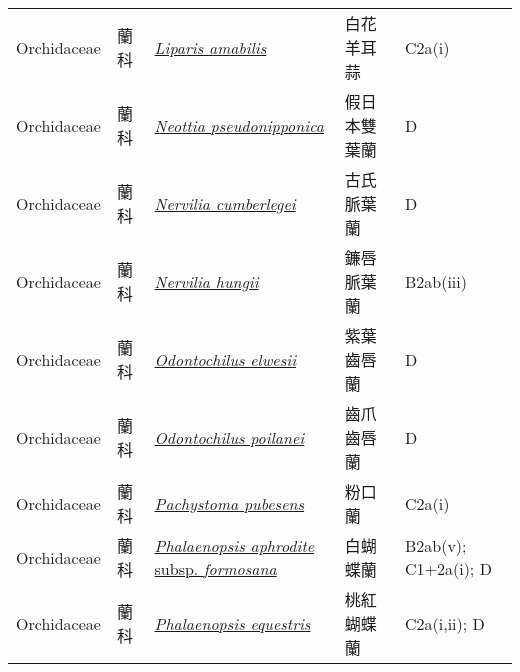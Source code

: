 {\begin{longtable}{L{2.5cm}L{2cm}L{5cm}L{2.5cm}L{3cm}}
    Orchidaceae & 蘭科 & \href{http://www.theplantlist.org/tpl1.1/search?q=Liparis+amabilis}{\textit{Liparis amabilis} } & 白花羊耳蒜 & C2a(i)    \\
    Orchidaceae & 蘭科 & \href{http://www.theplantlist.org/tpl1.1/search?q=Neottia+pseudonipponica}{\textit{Neottia pseudonipponica} } & 假日本雙葉蘭 & D    \\
    Orchidaceae & 蘭科 & \href{http://www.theplantlist.org/tpl1.1/search?q=Nervilia+cumberlegei}{\textit{Nervilia cumberlegei} } & 古氏脈葉蘭 & D    \\
    Orchidaceae & 蘭科 & \href{http://www.theplantlist.org/tpl1.1/search?q=Nervilia+hungii}{\textit{Nervilia hungii} } & 鐮唇脈葉蘭 & B2ab(iii)    \\
    Orchidaceae & 蘭科 & \href{http://www.theplantlist.org/tpl1.1/search?q=Odontochilus+elwesii}{\textit{Odontochilus elwesii} } & 紫葉齒唇蘭 & D    \\
    Orchidaceae & 蘭科 & \href{http://www.theplantlist.org/tpl1.1/search?q=Odontochilus+poilanei}{\textit{Odontochilus poilanei} } & 齒爪齒唇蘭 & D    \\
    Orchidaceae & 蘭科 & \href{http://www.theplantlist.org/tpl1.1/search?q=Pachystoma+pubesens}{\textit{Pachystoma pubesens} } & 粉口蘭 & C2a(i)    \\
    Orchidaceae & 蘭科 & \href{http://www.theplantlist.org/tpl1.1/search?q=Phalaenopsis+aphrodite+subsp.+formosana}{\textit{Phalaenopsis aphrodite} subsp. \textit{formosana} } & 白蝴蝶蘭 & B2ab(v); C1+2a(i); D    \\
    Orchidaceae & 蘭科 & \href{http://www.theplantlist.org/tpl1.1/search?q=Phalaenopsis+equestris}{\textit{Phalaenopsis equestris} } & 桃紅蝴蝶蘭 & C2a(i,ii); D    \\

\end{longtable}}
